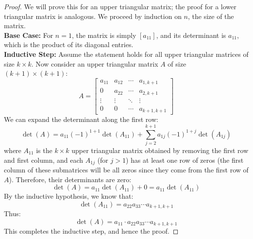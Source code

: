 \begin{proof}
    We will prove this for an upper triangular matrix; the proof for a lower triangular matrix is analogous. We proceed by induction on \(n\), the size of the matrix. \\
    \textbf{Base Case:} For \(n = 1\), the matrix is simply \([a_{11}]\), and its determinant is \(a_{11}\), which is the product of its diagonal entries. \\
    \textbf{Inductive Step:} Assume the statement holds for all upper triangular matrices of size \(k \times k\). Now consider an upper triangular matrix \(A\) of size \((k+1) \times (k+1)\):
    \[
        A = \begin{bmatrix}
            a_{11} & a_{12} & \cdots & a_{1,k+1} \\
            0 & a_{22} & \cdots & a_{2,k+1} \\
            \vdots & \vdots & \ddots & \vdots \\
            0 & 0 & \cdots & a_{k+1,k+1}
        \end{bmatrix}
    \]
    We can expand the determinant along the first row:
    \[
        \det(A) = a_{11} (-1)^{1+1} \det(A_{11}) + \sum_{j=2}^{k+1} a_{1j} (-1)^{1+j} \det(A_{1j})
    \]
    where \(A_{11}\) is the \(k \times k\) upper triangular matrix obtained by removing the first row and first column, and each \(A_{1j}\) (for \(j > 1\)) has at least one row of zeros (the first column of these submatrices will be all zeros since they come from the first row of \(A\)). Therefore, their determinants are zero:
    \[
        \det(A) = a_{11} \det(A_{11}) + 0 = a_{11} \det(A_{11})
    \]
    By the inductive hypothesis, we know that:
    \[
        \det(A_{11}) = a_{22} a_{33} \cdots a_{k+1,k+1}
    \]
    Thus:
    \[
        \det(A) = a_{11} \cdot a_{22} a_{33} \cdots a_{k+1,k+1}
    \]
    This completes the inductive step, and hence the proof.
\end{proof}

